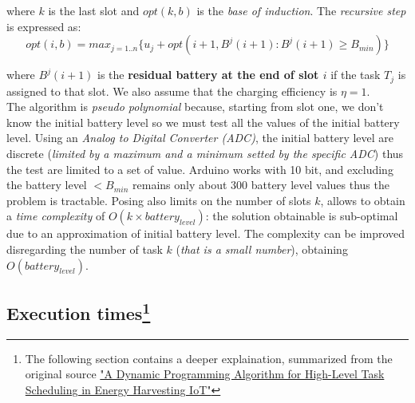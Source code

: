 \documentclass[10pt,a4paper]{report}
\theoremstyle{definition}
\begin{document}
where $k$ is the last slot and $opt(k,b)$ is the \textit{base of induction}. The \textit{recursive step} is expressed as:
\begin{equation}
	opt(i,b) = max_{j=1..n} \{u_{j} + opt(i+1, B^{j}(i+1): B^{j}(i+1) \geq B_{min})\}
\end{equation}

where $B^{j}(i+1)$ is the \textbf{residual battery at the end of slot $i$} if the task $T_{j}$ is assigned to that slot.
We also assume that the charging efficiency is $\eta = 1$.\\
The algorithm is \textit{pseudo polynomial} because, starting from slot one, we don't know the initial battery level so we must test all the values of the initial battery level. Using an \textit{Analog to Digital Converter (ADC)}, the initial battery level are discrete (\textit{limited by a maximum and a minimum setted by the specific ADC}) thus the test are limited to a set of value.
Arduino works with 10 bit, and excluding the battery level $< B_{min}$ remains only about 300 battery level values thus the problem is tractable.
Posing also limits on the number of slots $k$, allows to obtain a \textit{time complexity} of $O(k \times battery_{level})$: the solution obtainable is sub-optimal due to an approximation of initial battery level. The complexity can be improved disregarding the number of task $k$ (\textit{that is a small number}), obtaining $O(battery_{level})$.

\subsection[Execution Time]{Execution times\footnote{The following section contains a deeper explaination, summarized from the original source \href{https://ieeexplore.ieee.org/abstract/document/8344447}{"A Dynamic Programming Algorithm for High-Level Task Scheduling in Energy Harvesting IoT"}}}
\end{document}
